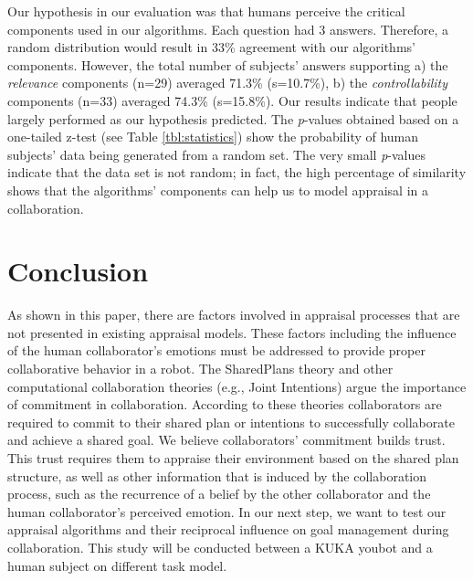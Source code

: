 \documentclass{article}
\begin{document}
% 

Our hypothesis in our evaluation was that humans perceive the critical
components used in our algorithms. Each question had 3 answers. Therefore, a
random distribution would result in 33\% agreement with our algorithms'
components. However, the total number of subjects' answers supporting a) the
\textit{relevance} components (n=29) averaged 71.3\% (s=10.7\%), b) the
\textit{controllability} components (n=33) averaged 74.3\% (s=15.8\%). Our
results indicate that people largely performed as our hypothesis predicted. The
\textit{p}-values obtained based on a one-tailed z-test (see Table
\ref{tbl:statistics}) show the probability of human subjects' data being
generated from a random set. The very small \textit{p}-values indicate that the
data set is not random; in fact, the high percentage of similarity shows that
the algorithms' components can help us to model appraisal in a collaboration.

\vspace{-2mm}
\section{Conclusion}
\vspace{-1mm}
As shown in this paper, there are factors involved in appraisal processes
that are not presented in existing appraisal models. These factors including
the influence of the human collaborator's emotions must be addressed to provide
proper collaborative behavior in a robot. The SharedPlans theory and other
computational collaboration theories (e.g., Joint Intentions) argue the
importance of commitment in collaboration. According to these theories
collaborators are required to commit to their shared plan or intentions to
successfully collaborate and achieve a shared goal. We believe collaborators'
commitment builds trust. This trust requires them to appraise their environment
based on the shared plan structure, as well as other information that is induced
by the collaboration process, such as the recurrence of a belief by the other
collaborator and the human collaborator's perceived emotion. In our next step,
we want to test our appraisal algorithms and their reciprocal influence on goal
management during collaboration. This study will be conducted between a KUKA
youbot and a human subject on different task model.
\end{document}
